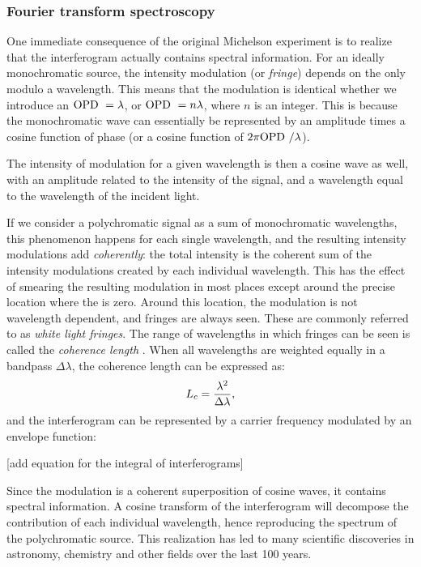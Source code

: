 \subsubsection{Fourier transform spectroscopy}

One immediate consequence of the original Michelson experiment is to realize that the interferogram actually contains spectral information. For an ideally monochromatic source, the intensity modulation (or \textit{fringe}) depends on the \OPD only modulo a wavelength. This means that the modulation is identical whether we introduce an $\textrm{OPD }  = \lambda$, or $\textrm{OPD }  = n\lambda$, where $n$ is an integer. This is because the monochromatic wave can essentially be represented by an amplitude times a cosine function of phase (or a cosine function of $2\pi\textrm{OPD } /\lambda$).

The intensity of modulation for a given wavelength is then a cosine wave as well, with an amplitude related to the intensity of the signal, and a wavelength equal to the wavelength of the incident light.

If we consider a polychromatic signal as a sum of monochromatic wavelengths, this phenomenon happens for each single wavelength, and the resulting intensity modulations add \textit{coherently}: the total intensity is the coherent sum of the intensity modulations created by each individual wavelength. This has the effect of smearing the resulting modulation in most places except around the precise location where the \OPD is zero. Around this location, the modulation is not wavelength dependent, and fringes are always seen. These are commonly referred to as \textit{white light fringes}. The range of wavelengths in which fringes can be seen is called the \textit{coherence length} \Lc. When all wavelengths are weighted equally in a bandpass $\Delta\lambda$, the coherence length can be expressed as:
\begin{equation}
L_c = \frac{\lambda^2}{\Delta\lambda},
\end{equation}
and the interferogram can be represented by a carrier frequency modulated by an envelope function:

[add equation for the integral of interferograms]

Since the modulation is a coherent superposition of cosine waves, it contains spectral information. A cosine transform of the interferogram will decompose the contribution of each individual wavelength, hence reproducing the spectrum of the polychromatic source. This realization has led to many scientific discoveries in astronomy, chemistry and other fields over the last 100 years.

